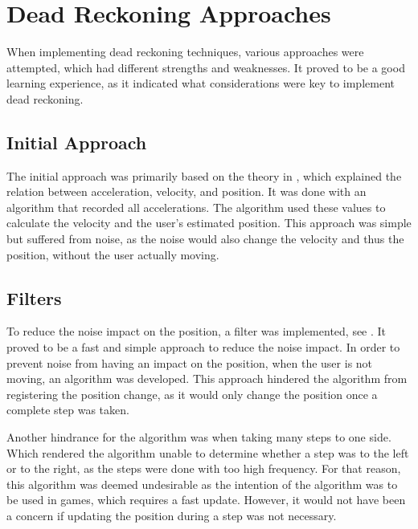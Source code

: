 \section{Dead Reckoning Approaches}\label{section:dead-reckoning-approaches}
When implementing dead reckoning techniques, various approaches were attempted, which had different strengths and weaknesses.
It proved to be a good learning experience, as it indicated what considerations were key to implement dead reckoning.

\subsection*{Initial Approach}
The initial approach was primarily based on the theory in , which explained the relation between acceleration, velocity, and position. 
It was done with an algorithm that recorded all accelerations.
The algorithm used these values to calculate the velocity and the user's estimated position. 
This approach was simple but suffered from noise, as the noise would also change the velocity and thus the position, without the user actually moving.

\subsection*{Filters}
To reduce the noise impact on the position, a filter was implemented, see . 
It proved to be a fast and simple approach to reduce the noise impact.
In order to prevent noise from having an impact on the position, when the user is not moving, an algorithm was developed.
This approach hindered the algorithm from registering the position change, as it would only change the position once a complete step was taken.

Another hindrance for the algorithm was when taking many steps to one side.
Which rendered the algorithm unable to determine whether a step was to the left or to the right, as the steps were done with too high frequency. 
For that reason, this algorithm was deemed undesirable as the intention of the algorithm was to be used in games, which requires a fast update.
However, it would not have been a concern if updating the position during a step was not necessary.

